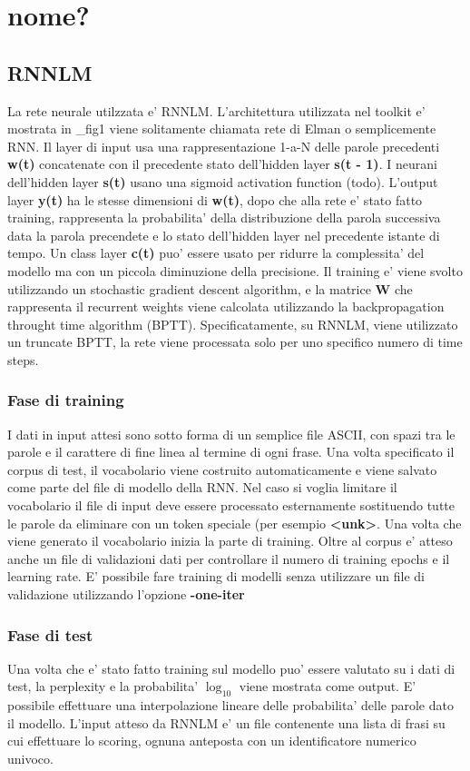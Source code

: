 \documentclass[a4paper,11pt]{book}
\theoremstyle{definition}
\begin{document}
\chapter{nome?}
\section{RNNLM}
La rete neurale utilzzata e' RNNLM. L'architettura utilizzata nel toolkit e' mostrata in \_fig1 viene solitamente chiamata rete di Elman o semplicemente RNN. Il layer di input usa una rappresentazione 1-a-N delle 
parole precedenti \textbf{w(t)} concatenate con il precedente stato dell'hidden layer \textbf{s(t - 1)}.
I neurani dell'hidden layer \textbf{s(t)} usano una sigmoid activation function (todo).
L'output layer \textbf{y(t)} ha le stesse dimensioni di \textbf{w(t)}, dopo che alla rete e' stato fatto training,
rappresenta la probabilita' della distribuzione della parola successiva data la parola precendete 
e lo stato dell'hidden layer nel precedente istante di tempo.
Un class layer \textbf{c(t)} puo' essere usato per ridurre la complessita' del modello ma con un piccola
diminuzione della precisione.
Il training e' viene svolto utilizzando un stochastic gradient descent algorithm, e la matrice \textbf{W}
che rappresenta il recurrent weights viene calcolata utilizzando la backpropagation throught time algorithm (BPTT).
Specificatamente, su RNNLM, viene utilizzato un truncate BPTT, la rete viene processata solo per uno specifico
numero di time steps.
\subsection{Fase di training}
I dati in input attesi sono sotto forma di un semplice file ASCII, con spazi tra le parole e il carattere di
fine linea al termine di ogni frase.
Una volta specificato il corpus di test, il vocabolario viene costruito automaticamente e viene salvato come parte
del file di modello della RNN.
Nel caso si voglia limitare il vocabolario il file di input deve essere processato esternamente sostituendo
tutte le parole da eliminare con un token speciale (per esempio \textbf{<unk>}.
Una volta che viene generato il vocabolario inizia la parte di training. Oltre al corpus e' atteso anche un
file di validazioni dati per controllare il numero di training epochs e  il learning rate.
E' possibile fare training di modelli senza utilizzare un file di validazione utilizzando l'opzione \textbf{-one-iter}
\subsection{Fase di test}
Una volta che e' stato fatto training sul modello puo' essere valutato su i dati di test, la perplexity e la 
probabilita' $\log_{10}$ viene mostrata come output.
E' possibile effettuare una interpolazione lineare delle probabilita' delle parole dato il modello. L'input atteso
da RNNLM e' un file contenente una lista di frasi su cui effettuare lo scoring, ognuna anteposta con un identificatore
numerico univoco.
\end{document}
